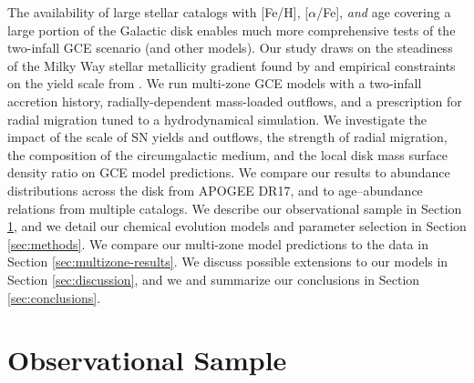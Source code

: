 \documentclass[twocolumn,twocolappendix,linenumbers]{aastex631}
\newcommand{\aFe}{[$\alpha$/Fe]\xspace}
\begin{document}
The availability of large stellar catalogs with [Fe/H], \aFe, {\it and} age covering a large portion of the Galactic disk enables much more comprehensive tests of the two-infall GCE scenario (and other models). Our study draws on the steadiness of the Milky Way stellar metallicity gradient found by \citet{johnson_milky_2024} and empirical constraints on the yield scale from \citet{weinberg_scale_2024}. We run multi-zone GCE models with a two-infall accretion history, radially-dependent mass-loaded outflows, and a prescription for radial migration tuned to a hydrodynamical simulation. We investigate the impact of the scale of SN yields and outflows, the strength of radial migration, the composition of the circumgalactic medium, and the local disk mass surface density ratio on GCE model predictions. We compare our results to abundance distributions across the disk from APOGEE DR17, and to age--abundance relations from multiple catalogs. We describe our observational sample in Section \ref{sec:observational-sample}, and we detail our chemical evolution models and parameter selection in Section \ref{sec:methods}. We compare our multi-zone model predictions to the data in Section \ref{sec:multizone-results}. We discuss possible extensions to our models in Section \ref{sec:discussion}, and we and summarize our conclusions in Section \ref{sec:conclusions}.

\section{Observational Sample}
\label{sec:observational-sample}
\end{document}
